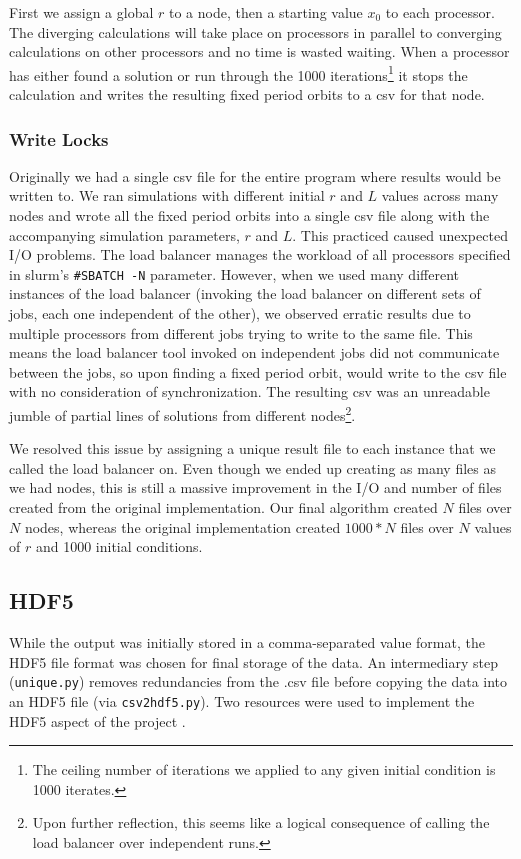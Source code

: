 \documentclass[12pt]{article}
\begin{document}
First we assign a global $r$ to a node, then a starting value $x_0$ to
each processor. The diverging calculations will take place on
processors in parallel to converging calculations on other processors
and no time is wasted waiting. When a processor has either found a
solution or run through the 1000 iterations\footnote{The ceiling
  number of iterations we applied to any given initial condition is
  1000 iterates.} it stops the calculation and writes the resulting
fixed period orbits to a csv for that node. 

\subsubsection{Write Locks}
\hspace{5mm}Originally we had a single csv file for the entire program
where results would be written to. We ran simulations with different
initial $r$ and $L$ values across many nodes and wrote all the fixed
period orbits into a single csv file along with the accompanying
simulation parameters, $r$ and $L$. This practiced caused unexpected
I/O problems. The load balancer manages the workload of all processors
specified in slurm's \texttt{\#SBATCH -N} parameter. However, when we
used many different instances of the load balancer (invoking the load
balancer on different sets of jobs, each one independent of the
other), we observed erratic results due to multiple processors from
different jobs trying to write to the same file. This means the load
balancer tool invoked on independent jobs did not communicate between
the jobs, so upon finding a fixed period orbit, would write to the csv
file with no consideration of synchronization. The resulting csv was
an unreadable jumble of partial lines of solutions from different
nodes\footnote{Upon further reflection, this seems like a logical
  consequence of calling the load balancer over independent runs.}. 

We resolved this issue by assigning a unique result file to each
instance that we called the load balancer on. Even though we ended up
creating as many files as we had nodes, this is still a massive
improvement in the I/O and number of files created from the original
implementation. Our final algorithm created $N$ files over $N$ nodes,
whereas the original implementation created $1000*N$ files over $N$ values
of $r$ and 1000 initial conditions.
\subsection{HDF5}
\hspace{5mm} While the output was initially stored in a
comma-separated value format, the HDF5 file format was chosen for
final storage of the data. An intermediary step (\texttt{unique.py})
removes redundancies from the .csv file before copying the data into
an HDF5 file (via \texttt{csv2hdf5.py}). Two resources were used to
implement the HDF5 aspect of the project \cite{folk} \cite{UserGuide}. 
\end{document}
